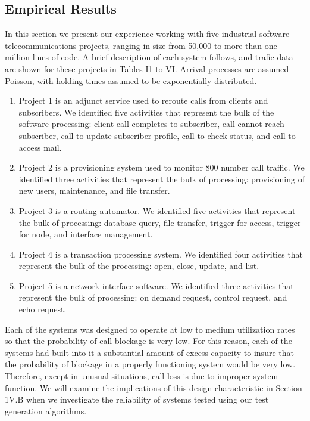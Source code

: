 \documentclass[journal, twoside]{IEEEtran}
\begin{document}
\subsection{Empirical Results}
In this section we present our experience working with five
industrial software telecommunications projects, ranging in
size from 50,000 to more than one million lines of code. A
brief description of each system follows, and trafic data are
shown for these projects in Tables I1 to VI. Arrival processes
are assumed Poisson, with holding times assumed to be exponentially distributed. 
\begin{enumerate}
    \item Project 1 is an adjunct service used to reroute calls from clients and subscribers. We identified five activities that represent the bulk of the software processing: client call completes to subscriber, call cannot reach subscriber, call to update subscriber profile, call to check status, and call to access mail. 
    \item Project 2 is a provisioning system used to monitor 800 number call traffic. We identified three activities that represent the bulk of processing: provisioning of new users, maintenance, and file transfer. 
    \item  Project 3 is a routing automator. We identified five activities that represent the bulk of processing: database query, file transfer, trigger for access, trigger for node, and interface management. 
    \item  Project 4 is a transaction processing system. We identified four activities that represent the bulk of the processing: open, close, update, and list. 
    \item Project 5 is a network interface software. We identified three activities that represent the bulk of processing: on demand request, control request, and echo request. 
\end{enumerate}
Each of the systems was designed to operate at low to medium utilization rates so that the probability of call blockage is
very low. For this reason, each of the systems had built into it
a substantial amount of excess capacity to insure that the probability of blockage in a properly functioning system would be
very low. Therefore, except in unusual situations, call loss is
due to improper system function. We will examine the implications of this design characteristic in Section 1V.B when we
investigate the reliability of systems tested using our test generation algorithms. 
\end{document}
